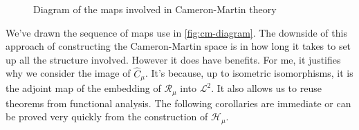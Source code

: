 \documentclass[fontsize=12pt, DIV=10]{scrreprt}
\theoremstyle{remark}
\newcommand{\calB}{\mathcal B}
\newcommand{\calH}{\mathcal H}
\newcommand{\calL}{\mathcal L}
\newcommand{\calR}{\mathcal R}
\newcommand{\dif}[1]{\text{d} #1}
\DeclareMathOperator{\ev}{ev}
\newcommand{\mudif}{\ensuremath{\, \mu(\dif x)}}
\begin{document}
\begin{figure}
	\centering
	\label{fig:cm-diagram}
	\caption{Diagram of the maps involved in Cameron-Martin theory}
\end{figure}
We've drawn the sequence of maps use in \vref{fig:cm-diagram}. The downside of this approach of constructing the Cameron-Martin space is in how long it takes to set up all the structure involved. However it does have benefits. For me, it justifies why we consider the image of $\hat{C}_{\mu}$. It's because, up to isometric isomorphisms, it is the adjoint map of the embedding of $\calR_{\mu}$ into $\calL^2$. It also allows us to reuse theorems from functional analysis. The following corollaries are immediate or can be proved very quickly from the construction of $\calH_{\mu}$.
\end{document}
